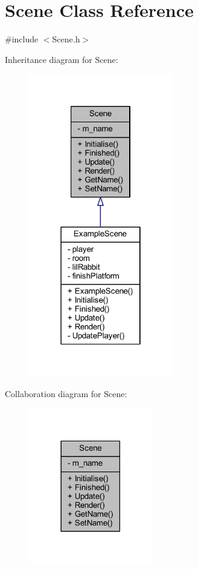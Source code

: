 \hypertarget{class_scene}{}\section{Scene Class Reference}
\label{class_scene}


{\ttfamily \#include $<$Scene.\+h$>$}



Inheritance diagram for Scene\+:\nopagebreak
\begin{figure}[H]
\begin{center}
\leavevmode
\includegraphics[width=178pt]{class_scene__inherit__graph}
\end{center}
\end{figure}


Collaboration diagram for Scene\+:\nopagebreak
\begin{figure}[H]
\begin{center}
\leavevmode
\includegraphics[width=153pt]{class_scene__coll__graph}
\end{center}
\end{figure}
